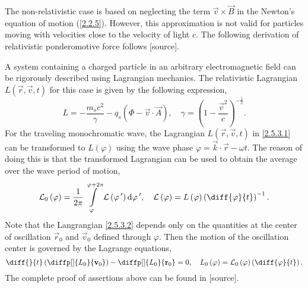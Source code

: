 The non-relativistic case is based on neglecting the term $ \vec{v} \times \vec{B} $ in the Newton's equation of motion (\ref{2.2.5}). However, this approximation is not valid for particles moving with velocities close to the velocity of light $ c $. The following derivation of relativistic ponderomotive force follows [source].

A system containing a charged particle in an arbitrary electromagnetic field can be rigorously described using Lagrangian mechanics. The relativistic Lagrangian $ L \left( \vec{r}, \vec{v}, t \right)  $ for this case is given by the following expression,
\begin{equation}
\label{2.5.3.1}
L = -\frac{m_s c^2}{\gamma} - q_s \left(\Phi - \vec{v} \cdot \vec{A} \right), \quad \gamma = \left( 1 - \frac{\vec{v}^{2}}{c} \right)^{-\frac{1}{2}}.
\end{equation}
For the traveling monochromatic wave, the Lagrangian $ L \left( \vec{r}, \vec{v}, t \right)  $ in \ref{2.5.3.1} can be transformed to $ L \left( \varphi \right)  $ using the wave phase $ \varphi = \vec{k} \cdot \vec{r} - \omega t $. The reason of doing this is that the transformed Lagrangian can be used to obtain the average over the wave period of motion,
\begin{equation}
\label{2.5.3.2}
\mathcal{L}_0 \left( \varphi \right) = \frac{1}{2 \pi} \int \limits_{\varphi}^{\varphi + 2\pi} \mathcal{L} \left( \varphi^{\: \prime} \right) \mathrm{d} \varphi^{\: \prime}, \quad \mathcal{L} \left( \varphi \right) = L \left( \varphi \right) \left( \diff{\varphi}{t} \right)^{-1}.
\end{equation}
Note that the Langrangian \ref{2.5.3.2} depends only on the quantities at the center of oscillation $ \vec{r}_0 $ and $ \vec{v}_0 $ defined through $ \varphi $. Then the motion of the oscillation center is governed by the Lagrange equations,
\begin{equation}
\label{2.5.3.3}
\diff{}{t} \left( \diffp[]{L_0}{\vec{v}_0} \right) -  \diffp[]{L_0}{\vec{r}_0} = 0, \quad L_0 \left( \varphi \right) = \mathcal{L}_0 \left( \varphi \right) \left( \diff{\varphi}{t} \right).
\end{equation}
The complete proof of assertions above can be found in [source].

